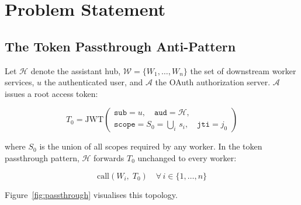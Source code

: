 \documentclass[journal]{IEEEtran}
\theoremstyle{definition}
\begin{document}
\section{Problem Statement}
\label{sec:problem}

\subsection{The Token Passthrough Anti-Pattern}

Let $\mathcal{H}$ denote the assistant hub, $\mathcal{W}=\{W_1,\ldots,W_n\}$ the
set of downstream worker services, $u$ the authenticated user, and $\mathcal{A}$
the OAuth authorization server. $\mathcal{A}$ issues a root access token:

\begin{equation}
T_0 = \mathrm{JWT}\!\left(\begin{array}{l}
  \texttt{sub} = u,\quad \texttt{aud} = \mathcal{H},\\[2pt]
  \texttt{scope} = S_0 = \textstyle\bigcup_{i}\, s_i,\quad
  \texttt{jti} = j_0
\end{array}\right)
\label{eq:root}
\end{equation}

where $S_0$ is the union of all scopes required by any worker. In the token
passthrough pattern, $\mathcal{H}$ forwards $T_0$ unchanged to every worker:

\begin{equation}
\mathrm{call}(W_i,\; T_0) \quad \forall\, i \in \{1, \ldots, n\}
\label{eq:passthrough}
\end{equation}

Figure~\ref{fig:passthrough} visualises this topology.
\end{document}
